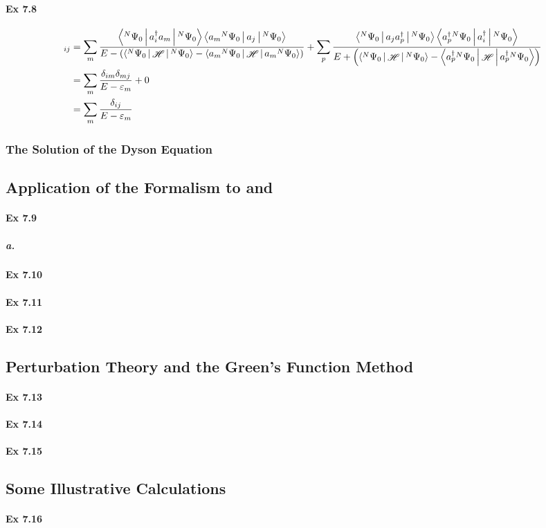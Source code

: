 \documentclass[a4paper]{article}
\DeclareMathOperator{\sH}{\mathscr{H}}
\newcommand{\ex}[1]{\paragraph{Ex #1}}
\newcommand{\subex}[1]{\subparagraph{#1}}
\numberwithin{equation}{subsection}
\begin{document}
\ex{7.8}
\begin{align}
[\vb{G}_0(E)]_{ij} &= \sum_m 
\dfrac{\Braket{^N\Psi_0 | a_i^\dagger a_m | ^N\Psi_0} 
	\Braket{a_m {^N\Psi}_0| a_j | ^N\Psi_0}
}{E - \qty(\Braket{^N\Psi_0|\sH |^N\Psi_0} 
- \Braket{a_m {^N\Psi}_0|\sH|a_m {^N\Psi}_0} )}
+ \sum_p
\dfrac{\Braket{^N\Psi_0 | a_j a_p^\dagger | ^N\Psi_0} 
	\Braket{a_p^\dagger {^N\Psi}_0| a_i^\dagger | ^N\Psi_0}
}{E + \qty(\Braket{^N\Psi_0|\sH |^N\Psi_0} 
	- \Braket{a_p^\dagger {^N\Psi}_0|\sH|a_p^\dagger {^N\Psi}_0} )} \notag\\
&= \sum_m \dfrac{\delta_{im}\delta_{mj}}{E - \varepsilon_m} + 0 \notag\\
&= \sum_m \dfrac{\delta_{ij}}{E - \varepsilon_m}
\end{align}

\subsubsection{The Solution of the Dyson Equation}

\subsection{Application of the Formalism to  and }
\ex{7.9}
\subex{a.}



\ex{7.10}



\ex{7.11}



\ex{7.12}



\subsection{Perturbation Theory and the Green's Function Method}
\ex{7.13}



\ex{7.14}



\ex{7.15}


\subsection{Some Illustrative Calculations}
\ex{7.16}
\end{document}
